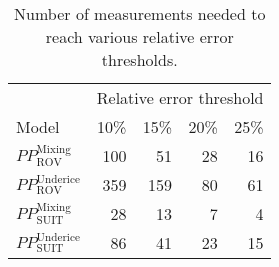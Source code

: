 \begin{table}[ht]
\centering
\begin{tabular}{lrrrr}
  \toprule
  & \multicolumn{4}{c}{Relative error threshold} \\
 Model & 10\% & 15\% & 20\% & 25\% \\
 \midrule
$PP^{\mathrm{Mixing}}_{\mathrm{ROV}}$ & 100 & 51 & 28 & 16 \\ 
  $PP^{\mathrm{Underice}}_{\mathrm{ROV}}$ & 359 & 159 & 80 & 61 \\ 
  $PP^{\mathrm{Mixing}}_{\mathrm{SUIT}}$ & 28 & 13 & 7 & 4 \\ 
  $PP^{\mathrm{Underice}}_{\mathrm{SUIT}}$ & 86 & 41 & 23 & 15 \\ 
   \bottomrule
\end{tabular}
\caption{Number of measurements needed to reach various relative error thresholds.} 
\end{table}
